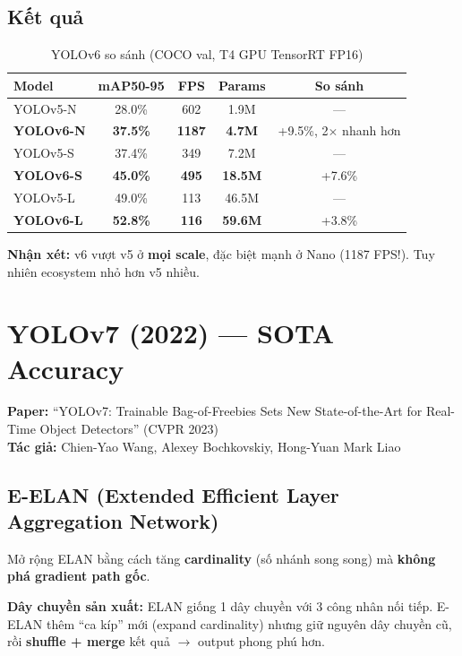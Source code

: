 \subsection{Kết quả}
\begin{table}[H]\centering
\caption{YOLOv6 so sánh (COCO val, T4 GPU TensorRT FP16)}
\begin{tabular}{lcccc}\toprule
\textbf{Model} & \textbf{mAP50-95} & \textbf{FPS} & \textbf{Params} & \textbf{So sánh} \\\midrule
YOLOv5-N & 28.0\% & 602 & 1.9M & --- \\
\textbf{YOLOv6-N} & \textbf{37.5\%} & \textbf{1187} & \textbf{4.7M} & +9.5\%, 2$\times$ nhanh hơn \\
YOLOv5-S & 37.4\% & 349 & 7.2M & --- \\
\textbf{YOLOv6-S} & \textbf{45.0\%} & \textbf{495} & \textbf{18.5M} & +7.6\% \\
YOLOv5-L & 49.0\% & 113 & 46.5M & --- \\
\textbf{YOLOv6-L} & \textbf{52.8\%} & \textbf{116} & \textbf{59.6M} & +3.8\% \\\bottomrule
\end{tabular}
\end{table}

\textbf{Nhận xét:} v6 vượt v5 ở \textbf{mọi scale}, đặc biệt mạnh ở Nano (1187 FPS!). Tuy nhiên ecosystem nhỏ hơn v5 nhiều.

\section{YOLOv7 (2022) --- SOTA Accuracy}
\textbf{Paper:} ``YOLOv7: Trainable Bag-of-Freebies Sets New State-of-the-Art for Real-Time Object Detectors'' (CVPR 2023)\\
\textbf{Tác giả:} Chien-Yao Wang, Alexey Bochkovskiy, Hong-Yuan Mark Liao

\subsection{E-ELAN (Extended Efficient Layer Aggregation Network)}
Mở rộng ELAN bằng cách tăng \textbf{cardinality} (số nhánh song song) mà \textbf{không phá gradient path gốc}.

\begin{analogybox}
\textbf{Dây chuyền sản xuất:} ELAN giống 1 dây chuyền với 3 công nhân nối tiếp. E-ELAN thêm ``ca kíp'' mới (expand cardinality) nhưng giữ nguyên dây chuyền cũ, rồi \textbf{shuffle + merge} kết quả $\rightarrow$ output phong phú hơn.
\end{analogybox}

